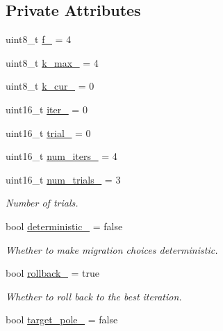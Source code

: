 \subsection*{Private Attributes}
\begin{DoxyCompactItemize}
\item 
uint8\+\_\+t \hyperlink{structvt_1_1vrt_1_1collection_1_1lb_1_1_gossip_l_b_a8e583b068a5241bf1960866c731e40d8}{f\+\_\+} = 4
\item 
uint8\+\_\+t \hyperlink{structvt_1_1vrt_1_1collection_1_1lb_1_1_gossip_l_b_a7871082bff02cbd26afe36d52a0b4304}{k\+\_\+max\+\_\+} = 4
\item 
uint8\+\_\+t \hyperlink{structvt_1_1vrt_1_1collection_1_1lb_1_1_gossip_l_b_aad96c8f2fc0c8ab0c2131da76bc01421}{k\+\_\+cur\+\_\+} = 0
\item 
uint16\+\_\+t \hyperlink{structvt_1_1vrt_1_1collection_1_1lb_1_1_gossip_l_b_af534fb854364c488b92716c7ff087abf}{iter\+\_\+} = 0
\item 
uint16\+\_\+t \hyperlink{structvt_1_1vrt_1_1collection_1_1lb_1_1_gossip_l_b_a3c9c57f24f2f52706f6257c4aa081d08}{trial\+\_\+} = 0
\item 
uint16\+\_\+t \hyperlink{structvt_1_1vrt_1_1collection_1_1lb_1_1_gossip_l_b_afd144df8d35532ba73746dd1d8bf6e6f}{num\+\_\+iters\+\_\+} = 4
\item 
uint16\+\_\+t \hyperlink{structvt_1_1vrt_1_1collection_1_1lb_1_1_gossip_l_b_a169fb2435d25e79da531f9eb465c55eb}{num\+\_\+trials\+\_\+} = 3
\begin{DoxyCompactList}\small\item\em Number of trials. \end{DoxyCompactList}\item 
bool \hyperlink{structvt_1_1vrt_1_1collection_1_1lb_1_1_gossip_l_b_afcbbee0f2c07c53a47098a1fa3900721}{deterministic\+\_\+} = false
\begin{DoxyCompactList}\small\item\em Whether to make migration choices deterministic. \end{DoxyCompactList}\item 
bool \hyperlink{structvt_1_1vrt_1_1collection_1_1lb_1_1_gossip_l_b_a8cc813e101bbbbc5a3d1accd69b6ba7d}{rollback\+\_\+} = true
\begin{DoxyCompactList}\small\item\em Whether to roll back to the best iteration. \end{DoxyCompactList}\item 
bool \hyperlink{structvt_1_1vrt_1_1collection_1_1lb_1_1_gossip_l_b_ac589aa54ba0a2e1b5d3e28330ba93096}{target\+\_\+pole\+\_\+} = false

\end{DoxyCompactItemize}
